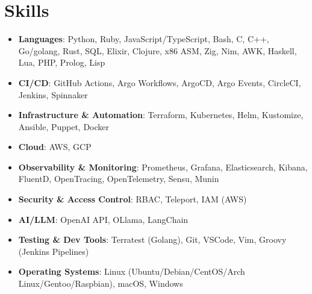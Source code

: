 \documentclass[letterpaper,11pt]{article}
\newcommand{\resumeItem}[2]{
\item[\textsc{}]\small{
    \textbf{#1}{: #2 \vspace{-2pt}}
  }
}
\newcommand{\resumeSubItem}[2]{\resumeItem{#1}{#2}\vspace{-4pt}}
\newcommand{\resumeSubHeadingListStart}{\begin{itemize}[leftmargin=*]}
\newcommand{\resumeSubHeadingListEnd}{\end{itemize}}
\begin{document}
\section{Skills}
  \resumeSubHeadingListStart
    \resumeSubItem{Languages}
      {Python, Ruby, JavaScript/TypeScript, Bash, C, C++, Go/golang, Rust, SQL, Elixir, Clojure, x86 ASM, Zig, Nim, AWK, Haskell, Lua, PHP, Prolog, Lisp}
    \resumeSubItem{CI/CD}
      {GitHub Actions, Argo Workflows, ArgoCD, Argo Events, CircleCI, Jenkins, Spinnaker}
    \resumeSubItem{Infrastructure \& Automation}
      {Terraform, Kubernetes, Helm, Kustomize, Ansible, Puppet, Docker}
    \resumeSubItem{Cloud}
      {AWS, GCP}
    \resumeSubItem{Observability \& Monitoring}
      {Prometheus, Grafana, Elasticsearch, Kibana, FluentD, OpenTracing, OpenTelemetry, Sensu, Munin}
    \resumeSubItem{Security \& Access Control}
      {RBAC, Teleport, IAM (AWS)}
    \resumeSubItem{AI/LLM}
      {OpenAI API, OLlama, LangChain}
    \resumeSubItem{Testing \& Dev Tools}
      {Terratest (Golang), Git, VSCode, Vim, Groovy (Jenkins Pipelines)}
    \resumeSubItem{Operating Systems}
      {Linux (Ubuntu/Debian/CentOS/Arch Linux/Gentoo/Raspbian), macOS, Windows}
  \resumeSubHeadingListEnd



\end{document}

